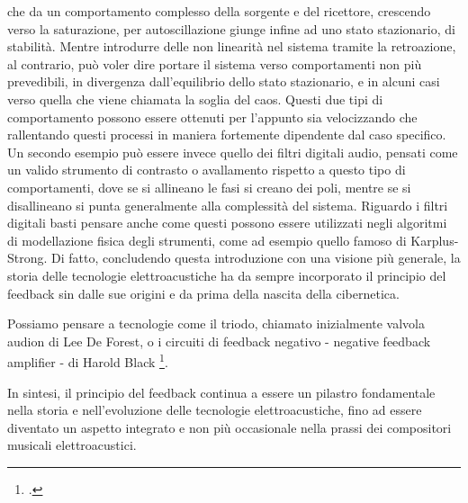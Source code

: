 che da un comportamento complesso della sorgente e del ricettore, crescendo
verso la saturazione, per autoscillazione giunge infine ad uno stato stazionario, di stabilità.
Mentre introdurre delle non linearità nel sistema tramite la retroazione,
al contrario, può voler dire portare il sistema verso comportamenti non più prevedibili,
in divergenza dall'equilibrio dello stato stazionario,
e in alcuni casi verso quella che viene chiamata la soglia del caos.
Questi due tipi di comportamento possono essere ottenuti per l'appunto
sia velocizzando che rallentando questi processi
in maniera fortemente dipendente dal caso specifico.
Un secondo esempio può essere invece quello dei filtri digitali audio,
pensati come un valido strumento
di contrasto o avallamento rispetto a questo tipo di comportamenti,
dove se si allineano le fasi si creano dei poli,
mentre se si disallineano si punta generalmente alla complessità del sistema.
Riguardo i filtri digitali basti pensare anche come questi possono essere utilizzati 
negli algoritmi di modellazione fisica
degli strumenti, come ad esempio quello famoso di Karplus-Strong.
Di fatto, concludendo questa introduzione con una visione più generale, 
la storia delle tecnologie elettroacustiche ha
da sempre incorporato il principio del feedback sin dalle sue origini e da prima della
nascita della cibernetica.


Possiamo pensare a tecnologie
come il triodo, chiamato inizialmente valvola audion di Lee De Forest,
o i circuiti di feedback negativo - negative feedback amplifier - di Harold Black
\footcite{haroldblackamplifier}.

In sintesi, il principio del feedback continua a essere un pilastro fondamentale nella storia 
e nell'evoluzione delle tecnologie elettroacustiche, 
fino ad essere diventato un aspetto integrato e non più occasionale 
nella prassi dei compositori musicali elettroacustici.
